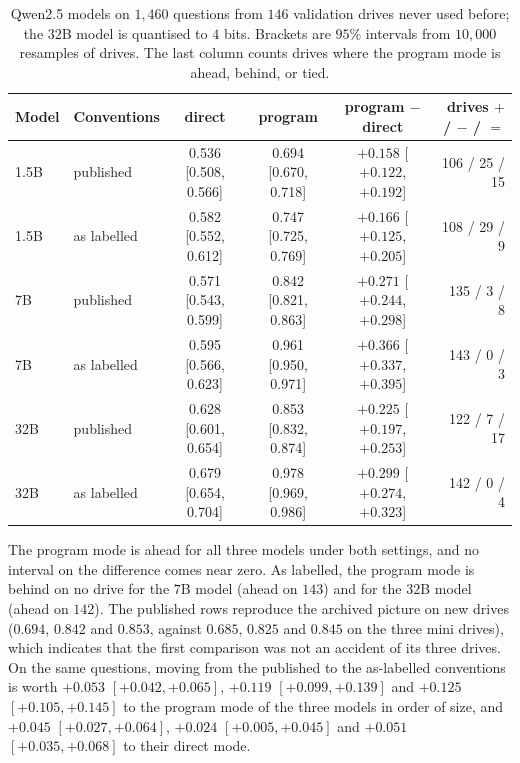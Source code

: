 \documentclass[11pt,a4paper]{article}
\begin{document}
\begin{table}[ht]
\centering
\footnotesize
\setlength{\tabcolsep}{4pt}
\begin{tabular}{llcccr}
\toprule
Model & Conventions & direct & program & program $-$ direct & drives $+$ / $-$ / $=$ \\
\midrule
1.5B & published   & 0.536 [0.508, 0.566] & 0.694 [0.670, 0.718] & $+0.158$ [$+0.122$, $+0.192$] & 106 / 25 / 15 \\
1.5B & as labelled & 0.582 [0.552, 0.612] & 0.747 [0.725, 0.769] & $+0.166$ [$+0.125$, $+0.205$] & 108 / 29 / 9 \\
7B   & published   & 0.571 [0.543, 0.599] & 0.842 [0.821, 0.863] & $+0.271$ [$+0.244$, $+0.298$] & 135 / 3 / 8 \\
7B   & as labelled & 0.595 [0.566, 0.623] & 0.961 [0.950, 0.971] & $+0.366$ [$+0.337$, $+0.395$] & 143 / 0 / 3 \\
32B  & published   & 0.628 [0.601, 0.654] & 0.853 [0.832, 0.874] & $+0.225$ [$+0.197$, $+0.253$] & 122 / 7 / 17 \\
32B  & as labelled & 0.679 [0.654, 0.704] & 0.978 [0.969, 0.986] & $+0.299$ [$+0.274$, $+0.323$] & 142 / 0 / 4 \\
\bottomrule
\end{tabular}
\caption{Qwen2.5 models on $1{,}460$ questions from $146$ validation drives
never used before; the $32$B model is quantised to $4$ bits. Brackets are $95\%$ intervals from $10{,}000$ resamples of
drives. The last column counts drives where the program mode is ahead,
behind, or tied.}
\label{tab:val}
\end{table}

The program mode is ahead for all three models under both settings, and no
interval on the difference comes near zero. As labelled, the program mode is
behind on no drive for the $7$B model (ahead on $143$) and for the $32$B
model (ahead on $142$). The published rows reproduce the archived picture on
new drives ($0.694$, $0.842$ and $0.853$, against $0.685$, $0.825$ and
$0.845$ on the three mini drives), which indicates that the first comparison
was not an accident of its three drives. On the same questions, moving from
the published to the as-labelled conventions is worth $+0.053$ $[+0.042,
+0.065]$, $+0.119$ $[+0.099, +0.139]$ and $+0.125$ $[+0.105, +0.145]$ to the
program mode of the three models in order of size, and $+0.045$ $[+0.027,
+0.064]$, $+0.024$ $[+0.005, +0.045]$ and $+0.051$ $[+0.035, +0.068]$ to
their direct mode.
\end{document}
